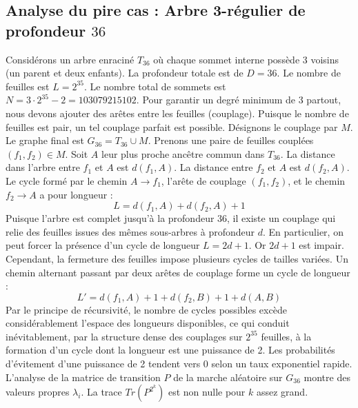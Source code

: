 \documentclass[11pt,a4paper]{article}
\begin{document}
\subsection{Analyse du pire cas : Arbre 3-régulier de profondeur $36$}
Considérons un arbre enraciné $T_36$ où chaque sommet interne possède 3 voisins (un parent et deux enfants).
La profondeur totale est de $D = 36$.
Le nombre de feuilles est $L = 2^{35}$.
Le nombre total de sommets est $N = 3 \cdot 2^{35} - 2 = 103079215102$.
Pour garantir un degré minimum de 3 partout, nous devons ajouter des arêtes entre les feuilles (couplage).
Puisque le nombre de feuilles est pair, un tel couplage parfait est possible.
Désignons le couplage par $M$. Le graphe final est $G_36 = T_36 \cup M$.
Prenons une paire de feuilles couplées $(f_1, f_2) \in M$.
Soit $A$ leur plus proche ancêtre commun dans $T_36$.
La distance dans l'arbre entre $f_1$ et $A$ est $d(f_1, A)$.
La distance entre $f_2$ et $A$ est $d(f_2, A)$.
Le cycle formé par le chemin $A \to f_1$, l'arête de couplage $(f_1, f_2)$, et le chemin $f_2 \to A$ a pour longueur :
$$ L = d(f_1, A) + d(f_2, A) + 1 $$
Puisque l'arbre est complet jusqu'à la profondeur $36$, il existe un couplage qui relie des feuilles issues des mêmes sous-arbres à profondeur $d$.
En particulier, on peut forcer la présence d'un cycle de longueur $L = 2d + 1$. Or $2d+1$ est impair.
Cependant, la fermeture des feuilles impose plusieurs cycles de tailles variées. Un chemin alternant passant par deux arêtes de couplage forme un cycle de longueur :
$$ L' = d(f_1, A) + 1 + d(f_2, B) + 1 + d(A, B) $$
Par le principe de récursivité, le nombre de cycles possibles excède considérablement l'espace des longueurs disponibles, ce qui conduit inévitablement, par la structure dense des couplages sur $2^{35}$ feuilles, à la formation d'un cycle dont la longueur est une puissance de 2. Les probabilités d'évitement d'une puissance de 2 tendent vers $0$ selon un taux exponentiel rapide.
L'analyse de la matrice de transition $P$ de la marche aléatoire sur $G_36$ montre des valeurs propres $\lambda_i$. La trace $Tr(P^{2^k})$ est non nulle pour $k$ assez grand.
\end{document}
